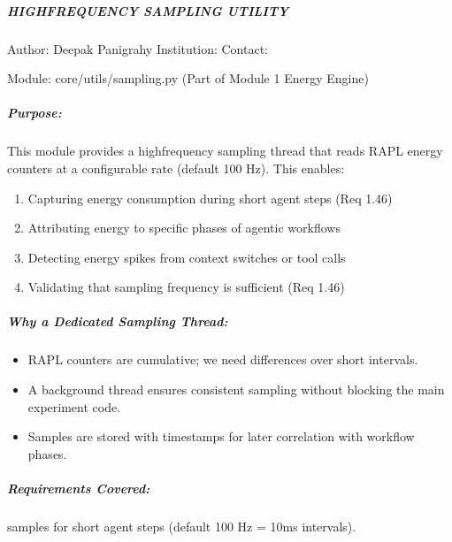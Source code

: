 \documentclass[letterpaper,10pt,english]{sphinxmanual}
\begin{document}
\subparagraph{HIGH\sphinxhyphen{}FREQUENCY SAMPLING UTILITY}
\label{\detokenize{core.utils.sampling:high-frequency-sampling-utility}}
\sphinxAtStartPar
Author: Deepak Panigrahy
Institution:
Contact:

\sphinxAtStartPar
Module: core/utils/sampling.py (Part of Module 1 \sphinxhyphen{} Energy Engine)


\subparagraph{Purpose:}
\label{\detokenize{core.utils.sampling:purpose}}
\sphinxAtStartPar
This module provides a high\sphinxhyphen{}frequency sampling thread that reads RAPL energy
counters at a configurable rate (default 100 Hz). This enables:
\begin{enumerate}
%
\item {} 
\sphinxAtStartPar
Capturing energy consumption during short agent steps (Req 1.46)

\item {} 
\sphinxAtStartPar
Attributing energy to specific phases of agentic workflows

\item {} 
\sphinxAtStartPar
Detecting energy spikes from context switches or tool calls

\item {} 
\sphinxAtStartPar
Validating that sampling frequency is sufficient (Req 1.46)

\end{enumerate}


\subparagraph{Why a Dedicated Sampling Thread:}
\label{\detokenize{core.utils.sampling:why-a-dedicated-sampling-thread}}\begin{itemize}
\item {} 
\sphinxAtStartPar
RAPL counters are cumulative; we need differences over short intervals.

\item {} 
\sphinxAtStartPar
A background thread ensures consistent sampling without blocking the main
experiment code.

\item {} 
\sphinxAtStartPar
Samples are stored with timestamps for later correlation with workflow phases.

\end{itemize}


\subparagraph{Requirements Covered:}
\label{\detokenize{core.utils.sampling:requirements-covered}}\begin{description}
\sphinxAtStartPar
samples for short agent steps (default 100 Hz = 10ms intervals).

\end{description}
\end{document}
